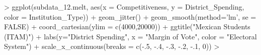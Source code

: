 \documentclass{article}
\begin{document}
\begin{Schunk}
\begin{Sinput}
> ggplot(subdata_12.melt, aes(x = Competitiveness, y = District_Spending, color = Institution_Type)) + geom_jitter() + geom_smooth(method='lm', se = FALSE) + coord_cartesian(ylim = c(4000,20000)) + ggtitle("Mexican Students (ITAM)") + labs(y="District Spending", x = "Margin of Vote", color = "Electoral System") + scale_x_continuous(breaks = c(-.5, -.4, -.3, -.2, -.1, 0))
> 
\end{Sinput}
\end{Schunk}






\end{document}
